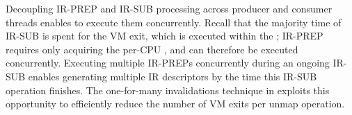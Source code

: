 






Decoupling IR-PREP and IR-SUB processing across producer and consumer threads enables 
    {\name} to execute them concurrently. 
Recall that the majority time of IR-SUB 
    is spent for the VM exit, 
    which is executed within the ; 
IR-PREP requires only acquiring the per-CPU , and can therefore be executed concurrently. 
Executing multiple IR-PREPs concurrently during an ongoing IR-SUB enables generating multiple IR descriptors 
    by the time this IR-SUB operation finishes. 
The one-for-many invalidations technique in {\name} exploits this opportunity 
    to efficiently reduce the number of VM exits per unmap operation.

    

